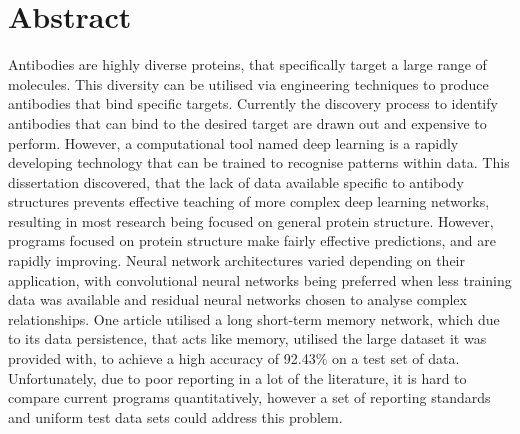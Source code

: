\chapter{Abstract}

Antibodies are highly diverse proteins, that specifically target a large range of molecules. This diversity can be utilised via engineering techniques to produce antibodies that bind specific targets. Currently the discovery process to identify antibodies that can bind to the desired target are drawn out and expensive to perform. However, a computational tool named deep learning is a rapidly developing technology that can be trained to recognise patterns within data. This dissertation discovered, that the lack of data available specific to antibody structures prevents effective teaching of more complex deep learning networks, resulting in most research being focused on general protein structure. However, programs focused on protein structure make fairly effective predictions, and are rapidly improving. Neural network architectures varied depending on their application, with convolutional neural networks being preferred when less training data was available and residual neural networks chosen to analyse complex relationships. One article utilised a long short-term memory network, which due to its data persistence, that acts like memory, utilised the large dataset it was provided with, to achieve a high accuracy of 92.43\% on a test set of data. Unfortunately, due to poor reporting in a lot of the literature, it is hard to compare current programs quantitatively, however a set of reporting standards and uniform test data sets could address this problem.